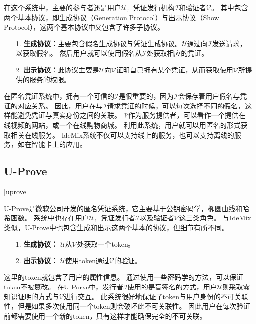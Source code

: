 在这个系统中，主要的参与者还是用户$\mathcal{U}$，凭证发行机构$\mathcal{I}$和验证者$\mathcal{V}$。
其中包含两个基本协议，即生成协议（Generation Protocol）与出示协议（Show Protocol），这两个基本协议中又包含了许多子协议。

\begin{itemize}
  \item[1.] \textbf{生成协议：}主要包含假名生成协议与凭证生成协议。$\mathcal{U}$通过向$\mathcal{I}$发送请求，以获取假名。
  然后用户就可以使用假名从$\mathcal{I}$处获取相应的凭证。
  \item[2.] \textbf{出示协议：}此协议主要是$\mathcal{U}$向$\mathcal{V}$证明自己拥有某个凭证，从而获取使用$\mathcal{V}$所提供的服务的权限。
\end{itemize}

在匿名凭证系统中，拥有一个可信的$\mathcal{I}$是很重要的，因为$\mathcal{I}$会保存着用户假名与凭证的对应关系。
因此，用户在与$\mathcal{I}$请求凭证的时候，可以每次选择不同的假名，这样能避免凭证与真实身份之间的关联。
$\mathcal{V}$作为服务提供者，可以看作一个提供在线视频的网站，或一个在线购物商城。
利用此系统，用户就可以用匿名的形式获取相关在线服务。
IdeMix系统不仅可以支持线上的服务，也可以支持离线的服务，如在智能卡上的应用\cite{bichsel2009anonymous}。

\subsection{U-Prove}[uprove]

U-Prove是微软公司开发的匿名凭证系统，它主要基于公钥密码学，椭圆曲线和哈希函数。
系统中也存在用户$\mathcal{U}$，凭证发行者$\mathcal{I}$以及验证者$\mathcal{V}$这三类角色。
与IdeMix类似，U-Prove中也包含生成和出示这两个基本的协议，但细节有所不同。

\begin{itemize}
  \item[1.] \textbf{生成协议：} $\mathcal{U}$从$\mathcal{V}$处获取一个token。
  \item[2.] \textbf{出示协议：} $\mathcal{U}$使用token通过$\mathcal{V}$的验证。
\end{itemize}

这里的token就包含了用户的属性信息。
通过使用一些密码学的方法，可以保证token不被篡改。
在U-Porve中，发行者$\mathcal{I}$使用的是盲签名的方式，用户$\mathcal{U}$则采取零知识证明的方式与$\mathcal{V}$进行交互。
此系统很好地保证了token与用户身份的不可关联性，但是如果多次使用同一个token则会破坏此不可关联性。
因此用户在每次验证前都需要使用一个新的token，只有这样才能确保完全的不可关联。

